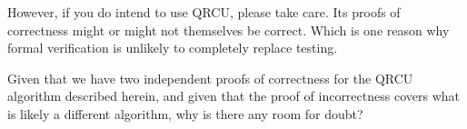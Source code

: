 However, if you do intend to use QRCU, please take care.
Its proofs of correctness might or might not themselves be correct.
Which is one reason why formal verification is unlikely to
completely replace testing.

\QuickQuiz{}
	Given that we have two independent proofs of correctness for
	the QRCU algorithm described herein, and given that the
	proof of incorrectness covers what is likely a different
	algorithm, why is there any room for doubt?
 \QuickQuizEnd
